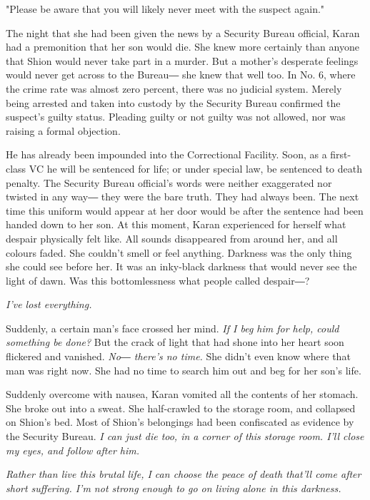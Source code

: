 "Please be aware that you will likely never meet with the suspect
again."

The night that she had been given the news by a Security Bureau
official, Karan had a premonition that her son would die. She knew more
certainly than anyone that Shion would never take part in a murder. But
a mother's desperate feelings would never get across to the Bureau― she
knew that well too. In No. 6, where the crime rate was almost zero
percent, there was no judicial system. Merely being arrested and taken
into custody by the Security Bureau confirmed the suspect's guilty
status. Pleading guilty or not guilty was not allowed, nor was raising a
formal objection.

He has already been impounded into the Correctional Facility. Soon, as a
first-class VC he will be sentenced for life; or under special law, be
sentenced to death penalty. The Security Bureau official's words were
neither exaggerated nor twisted in any way― they were the bare truth.
They had always been. The next time this uniform would appear at her
door would be after the sentence had been handed down to her son. At
this moment, Karan experienced for herself what despair physically felt
like. All sounds disappeared from around her, and all colours faded. She
couldn't smell or feel anything. Darkness was the only thing she could
see before her. It was an inky-black darkness that would never see the
light of dawn. Was this bottomlessness what people called despair―?

\emph{I've lost everything.}

Suddenly, a certain man's face crossed her mind. \emph{If I beg him for help,
could something be done?} But the crack of light that had shone into her
heart soon flickered and vanished. \emph{No― there's no time.} She didn't even
know where that man was right now. She had no time to search him out and
beg for her son's life.

Suddenly overcome with nausea, Karan vomited all the contents of her
stomach. She broke out into a sweat. She half-crawled to the storage
room, and collapsed on Shion's bed. Most of Shion's belongings had been
confiscated as evidence by the Security Bureau.\emph{ I can just die too, in a
corner of this storage room. I'll close my eyes, and follow after him.}

\emph{Rather than live this brutal life, I can choose the peace of death
that'll come after short suffering. I'm not strong enough to go on
living alone in this darkness.}

